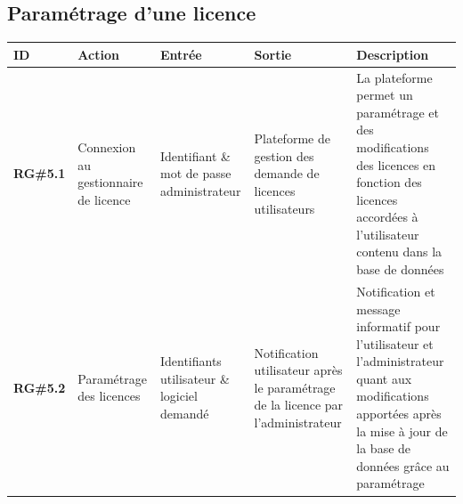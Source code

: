 \subsection{Paramétrage d'une licence}

\begin{table}[!h] %
    \small
    \begin{tabular}{
        |>{\raggedright\arraybackslash}m{1.5cm}
        |>{\raggedright\arraybackslash}m{1.9cm}
        |>{\raggedright\arraybackslash}m{2.5cm}
        |>{\raggedright\arraybackslash}m{2.5cm}
        |>{\raggedright\arraybackslash}m{7cm}
        |} 
	\hline
	    \textbf{ID} & \textbf{Action} & \textbf{Entrée} & \textbf{Sortie} & \textbf{Description} \\
	\hline
	    \textbf{RG\#5.1} & Connexion au gestionnaire de licence & Identifiant \& mot de passe administrateur & Plateforme de gestion  des demande de licences utilisateurs & La plateforme permet un paramétrage et des modifications des licences en fonction des licences accordées à l'utilisateur contenu dans la base de données\\
	\hline
	    \textbf{RG\#5.2} & Paramétrage  des licences& Identifiants utilisateur \&  logiciel demandé & Notification utilisateur après le paramétrage de la licence par l'administrateur & Notification et message informatif pour l'utilisateur et l'administrateur quant aux modifications apportées après la mise à jour de la base de données grâce au paramétrage\\
	\hline	    
    \end{tabular}
\end{table}


